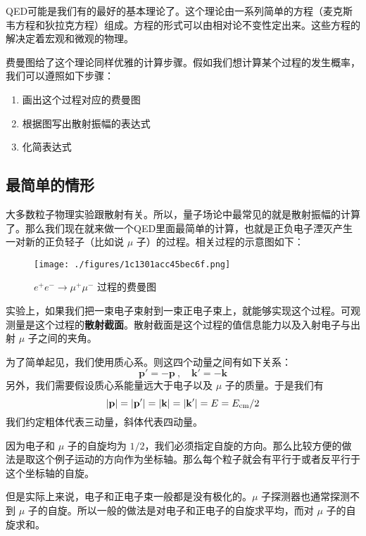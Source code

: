 

QED可能是我们有的最好的基本理论了。这个理论由一系列简单的方程（麦克斯韦方程和狄拉克方程）组成。方程的形式可以由相对论不变性定出来。这些方程的解决定着宏观和微观的物理。

费曼图给了这个理论同样优雅的计算步骤。假如我们想计算某个过程的发生概率，我们可以遵照如下步骤：

\begin{enumerate}
\item 画出这个过程对应的费曼图
\item 根据图写出散射振幅的表达式
\item 化简表达式
\end{enumerate}

\subsection{最简单的情形}
大多数粒子物理实验跟散射有关。所以，量子场论中最常见的就是散射振幅的计算了。那么我们现在就来做一个QED里面最简单的计算，也就是正负电子湮灭产生一对新的正负轻子（比如说 $\mu$ 子）的过程。相关过程的示意图如下：

\begin{figure}[ht]
\centering
\texttt{[image: ./figures/1c1301acc45bec6f.png]}
\caption{$e^+e^-\rightarrow\mu^+\mu^-$ 过程的费曼图} \label{fig_QFT0_1}
\end{figure}

实验上，如果我们把一束电子束射到一束正电子束上，就能够实现这个过程。可观测量是这个过程的\textbf{散射截面}。散射截面是这个过程的值信息能力以及入射电子与出射 $\mu$ 子之间的夹角。

为了简单起见，我们使用质心系。则这四个动量之间有如下关系：
\begin{equation}
\mathbf p' = - \mathbf p~, \quad \mathbf k'=-\mathbf k
\end{equation}
另外，我们需要假设质心系能量远大于电子以及 $\mu$ 子的质量。于是我们有
\begin{equation}
|\mathbf p| = |\mathbf p'| = |\mathbf k| = |\mathbf k'| = E = E_{\rm cm}/2
\end{equation}
我们约定粗体代表三动量，斜体代表四动量。

因为电子和 $\mu$ 子的自旋均为 $1/2$，我们必须指定自旋的方向。那么比较方便的做法是取这个例子运动的方向作为坐标轴。那么每个粒子就会有平行于或者反平行于这个坐标轴的自旋。

但是实际上来说，电子和正电子束一般都是没有极化的。$\mu$ 子探测器也通常探测不到 $\mu$ 子的自旋。所以一般的做法是对电子和正电子的自旋求平均，而对 $\mu$ 子的自旋求和。

